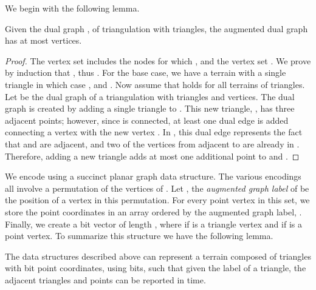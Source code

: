We begin with the following lemma. 

\begin{lemma}\label{lem:points_for_dual}
Given the dual graph , of triangulation  with 
 triangles, the augmented dual graph  has at most  
vertices.
\end{lemma}

\begin{proof}
The vertex set  includes the nodes  for which 
, and the vertex set . 
We prove by induction that , thus . 
For the base case, we have a terrain  with a single triangle in which case 
, and . 
Now assume that  holds for all terrains of  triangles. 
Let  be the dual graph of a triangulation  with  
triangles and  vertices. 
The dual graph  is created by adding a single triangle 
to . 
This new triangle, , has three adjacent points; however, 
since  is connected, at least one dual edge is added 
connecting a vertex  with the new vertex 
. 
In , this dual edge represents the fact that  and  are 
adjacent, and two of the vertices from  adjacent to  are already 
in . Therefore, adding a new triangle adds at most one 
additional point to  and .
\end{proof}

We encode  using a succinct planar graph data structure.
The various encodings all involve a permutation of the vertices of 
.
Let , the \emph{augmented graph label} of  be 
the position of a vertex  in this permutation. 
For every point vertex  in this set, 
we store the point coordinates in an array  ordered by the 
augmented graph label, . 
Finally, we create a bit vector  of length , where 
 if  is a triangle vertex and  if  is a 
point vertex. 
To summarize this structure we have the following lemma.

\begin{lemma}\label{lem:terrain_space}
The data structures described above can represent a terrain  composed 
of  triangles with  bit point coordinates, using 
 bits, such that given the label of a triangle, the adjacent
 triangles and points can be reported in  time.
\end{lemma}

